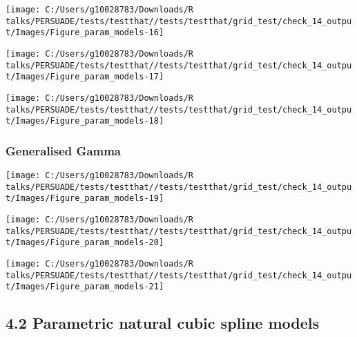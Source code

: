 \documentclass[
]{article}
\begin{document}
\begin{flushleft}\texttt{[image: C:/Users/g10028783/Downloads/R talks/PERSUADE/tests/testthat//tests/testthat/grid\_test/check\_14\_output/Images/Figure\_param\_models-16]} \end{flushleft}

\begin{flushleft}\texttt{[image: C:/Users/g10028783/Downloads/R talks/PERSUADE/tests/testthat//tests/testthat/grid\_test/check\_14\_output/Images/Figure\_param\_models-17]} \end{flushleft}

\begin{flushleft}\texttt{[image: C:/Users/g10028783/Downloads/R talks/PERSUADE/tests/testthat//tests/testthat/grid\_test/check\_14\_output/Images/Figure\_param\_models-18]} \end{flushleft}

\clearpage

\subsubsection{Generalised Gamma}\label{generalised-gamma}

\begin{flushleft}\texttt{[image: C:/Users/g10028783/Downloads/R talks/PERSUADE/tests/testthat//tests/testthat/grid\_test/check\_14\_output/Images/Figure\_param\_models-19]} \end{flushleft}

\begin{flushleft}\texttt{[image: C:/Users/g10028783/Downloads/R talks/PERSUADE/tests/testthat//tests/testthat/grid\_test/check\_14\_output/Images/Figure\_param\_models-20]} \end{flushleft}

\begin{flushleft}\texttt{[image: C:/Users/g10028783/Downloads/R talks/PERSUADE/tests/testthat//tests/testthat/grid\_test/check\_14\_output/Images/Figure\_param\_models-21]} \end{flushleft}

\clearpage

\subsection{4.2 Parametric natural cubic spline
models}\label{parametric-natural-cubic-spline-models}
\end{document}
